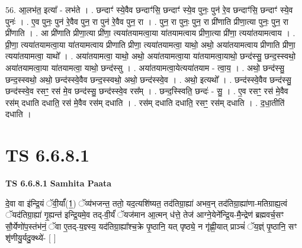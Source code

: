 \documentclass[17pt]{extarticle}
\begin{document}
56. आ॒लभ॑त॒ इत्या᳚ - लभ॑ते । . छन्दाꣳ॑ स्ये॒वैव छन्दाꣳ॑सि॒ छन्दाꣳ॑ स्ये॒व पुनः॒ पुन॑ रे॒व छन्दाꣳ॑सि॒ छन्दाꣳ॑ स्ये॒व पुनः॑ । . ए॒व पुनः॒ पुन॑ रे॒वैव पुन॒ रा पुन॑ रे॒वैव पुन॒ रा । . पुन॒ रा पुनः॒ पुन॒ रा प्री॑णाति प्रीणा॒त्या पुनः॒ पुन॒ रा प्री॑णाति । . आ प्री॑णाति प्रीणा॒त्या प्री॑णा॒ त्यया॑तयामत्वा॒या या॑तयामत्वाय प्रीणा॒त्या प्री॑णा॒ त्यया॑तयामत्वाय । . प्री॒णा॒ त्यया॑तयामत्वा॒या या॑तयामत्वाय प्रीणाति प्रीणा॒ त्यया॑तयामत्वा॒ याथो॒ अथो॒ अया॑तयामत्वाय प्रीणाति प्रीणा॒ त्यया॑तयामत्वा॒ याथो᳚ । . अया॑तयामत्वा॒ याथो॒ अथो॒ अया॑तयामत्वा॒या या॑तयामत्वा॒याथो॒ छन्द॑स्सु॒ छन्द॒स्स्वथो॒ अया॑तयामत्वा॒या या॑तयामत्वा॒ याथो॒ छन्द॑स्सु । . अया॑तयामत्वा॒येत्यया॑तयाम - त्वा॒य॒ । . अथो॒ छन्द॑स्सु॒ छन्द॒स्स्वथो॒ अथो॒ छन्द॑स्स्वे॒वैव छन्द॒स्स्वथो॒ अथो॒ छन्द॑स्स्वे॒व । . अथो॒ इत्यथो᳚ । . छन्द॑स्स्वे॒वैव छन्द॑स्सु॒ छन्द॑स्स्वे॒व रसꣳ॒॒ रस॑ मे॒व छन्द॑स्सु॒ छन्द॑स्स्वे॒व रस᳚म् । . छन्द॒स्स्विति॒ छन्दः॑ - सु॒ । . ए॒व रसꣳ॒॒ रस॑ मे॒वैव रस॑म् दधाति दधाति॒ रस॑ मे॒वैव रस॑म् दधाति । . रस॑म् दधाति दधाति॒ रसꣳ॒॒ रस॑म् दधाति । . द॒धा॒तीति॑ दधाति । \newline
\pagebreak
{}

\section{ TS 6.6.8.1 }

\textbf{TS 6.6.8.1 } \newline
\textbf{Samhita Paata} \newline

दे॒वा वा इ॑न्द्रि॒यं ॅवी॒र्यां᳚(1॒) ॅव्य॑भजन्त॒ ततो॒ यद॒त्यशि॑ष्यत॒ तद॑तिग्रा॒ह्या॑ अभव॒न् तद॑तिग्रा॒ह्या॑णा-मतिग्राह्य॒त्वं ॅयद॑तिग्रा॒ह्या॑ गृ॒ह्यन्त॑ इन्द्रि॒यमे॒व तद्-वी॒र्यं॑ ॅयज॑मान आ॒त्मन् ध॑त्ते॒ तेज॑ आग्ने॒येने᳚न्द्रि॒य-मै॒न्द्रेण॑ ब्रह्मवर्च॒सꣳ सौ॒र्येणो॑प॒स्तंभ॑नं॒ ॅवा ए॒तद्-य॒ज्ञ्स्य॒ यद॑तिग्रा॒ह्या᳚श्च॒क्रे पृ॒ष्ठानि॒ यत् पृष्ठ्ये॒ न गृ॑ह्णी॒यात् प्राञ्चं॑ ॅय॒ज्ञ्ं पृ॒ष्ठानि॒ सꣳ शृ॑णीयु॒र्यदु॒क्थ्ये॑- [  ] \newline
\end{document}
